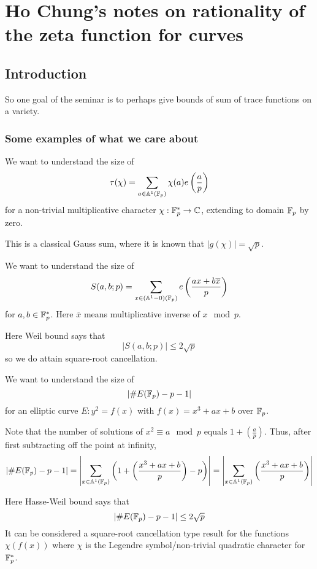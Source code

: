 \documentclass[letterpaper,11pt]{article}
\begin{document}
\section{Ho Chung's notes on rationality of the zeta function for curves}
\subsection{Introduction}
So one goal of the seminar is to perhaps give bounds of sum of trace functions on a variety.
\subsubsection{Some examples of what we care about}
\begin{ex}
We want to understand the size of 
\[
\tau(\chi) = \sum_{a \in \mathbb{A}^1(\mathbb{F}_p)} \chi(a) e\left(\frac{a}{p}\right)
\]
for a non-trivial multiplicative character $\chi: \mathbb{F}_p^* \to \mathbb{C}$, extending to domain $\mathbb{F}_p$ by zero.

This is a classical Gauss sum, where it is known that $|g(\chi)| = \sqrt{p}$.
\end{ex}
\begin{ex}
We want to understand the size of 
\[
S(a,b;p) = \sum_{x \in (\mathbb{A}^1 - 0)(\mathbb{F}_p)} e\left(\frac{ax + b\overline{x}}{p}\right)
\]
for $a,b \in \mathbb{F}_p^*$. Here $\overline{x}$ means multiplicative inverse of $x \mod p$.

Here Weil bound says that 
\[
|S(a,b;p)| \leq 2\sqrt{p}
\]
so we do attain square-root cancellation.
\end{ex}
\begin{ex}
We want to understand the size of 
\[
|\#E(\mathbb{F}_p) - p - 1|
\]
for an elliptic curve $E: y^2 = f(x)$ with $f(x) = x^3+ax+b$ over $\mathbb{F}_p$. 

Note that the number of solutions of $x^2 \equiv a \mod p$ equals $\displaystyle 1 + \left(\frac{a}{p}\right)$. Thus, after first subtracting off the point at infinity,
\[
|\#E(\mathbb{F}_p) - p - 1| = \left| \sum_{x \in \mathbb{A}^1(\mathbb{F}_p)} \left(1 + \left(\frac{x^3+ax+b}{p}\right) - p \right) \right| = \left|\sum_{x \in \mathbb{A}^1(\mathbb{F}_p)} \left(\frac{x^3+ax+b}{p}\right) \right|
\]

Here Hasse-Weil bound says that 
\[
|\#E(\mathbb{F}_p) - p - 1| \leq 2\sqrt{p}
\]
It can be considered a square-root cancellation type result for the functions $\chi(f(x))$ where $\chi$ is the Legendre symbol/non-trivial quadratic character for $\mathbb{F}_p^*$.
\end{ex}
\end{document}

